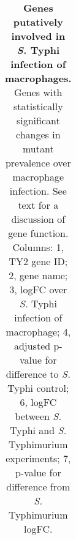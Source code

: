 %
\begin{table}
   \tiny
   \centering
   \noindent
    \caption[Genes putatively involved in {\it S.} Typhi infection of macrophages]{\textbf{Genes putatively involved in {\it S.} Typhi infection of macrophages.} Genes with statistically significant changes in mutant prevalence over macrophage infection. See text for a discussion of gene function. Columns: 1, TY2 gene ID; 2, gene name; 3, logFC over {\it S.} Typhi infection of macrophage; 4, adjusted p-value for difference to {\it S.} Typhi control; 6, logFC between {\it S.} Typhi and {\it S.} Typhimurium experiments; 7, p-value for difference from {\it S.} Typhimurium logFC. }
    \begin{tabular}{ l
    				l
				l
    				c
				c
				c
				c
				}
   

\end{tabular}
\end{table}
